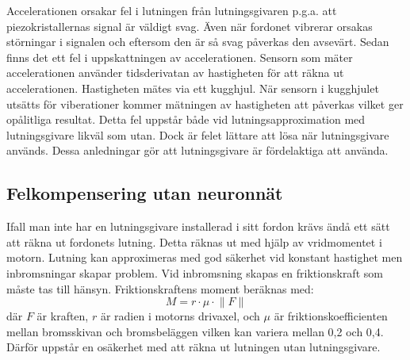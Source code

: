 Accelerationen orsakar fel i lutningen från lutningsgivaren p.g.a. att
piezokristallernas signal är väldigt svag.
Även när fordonet vibrerar orsakas störningar i signalen och eftersom den är så svag
påverkas den avsevärt.
Sedan finns det ett fel i uppskattningen av accelerationen.
Sensorn som mäter accelerationen använder tidsderivatan av hastigheten för
att räkna ut accelerationen.
Hastigheten mätes via ett kugghjul.
När sensorn i kugghjulet utsätts för viberationer kommer mätningen av
hastigheten att påverkas vilket ger opålitliga resultat.
Detta fel uppstår både vid lutningsapproximation med lutningsgivare likväl som utan.
Dock är felet lättare att lösa när lutningsgivare används.
Dessa anledningar gör att lutningsgivare är fördelaktiga att använda.
\autocite{lauri17}

\subsection{Felkompensering utan neuronnät}
Ifall man inte har en lutningsgivare installerad i sitt fordon krävs ändå ett
sätt att räkna ut fordonets lutning.
Detta räknas ut med hjälp av vridmomentet i motorn.
Lutning kan approximeras med god säkerhet vid konstant hastighet men inbromsningar
skapar problem.
Vid inbromsning skapas en friktionskraft som måste tas till hänsyn.
Friktionskraftens moment beräknas med:
\begin{equation}
	M = r \cdot \mu \cdot \lVert F \rVert
\end{equation}
där $F$ är kraften, $r$ är radien i motorns drivaxel, och $\mu$ är friktionskoefficienten
mellan bromsskivan och bromsbeläggen vilken kan variera mellan 0,2 och 0,4.
Därför uppstår en osäkerhet med att räkna ut lutningen utan lutningsgivare.
\autocite{lauri17}


